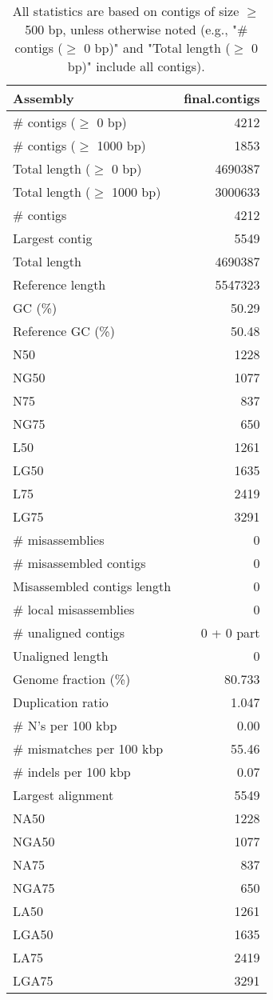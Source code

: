 \documentclass[12pt,a4paper]{article}
\begin{document}
\begin{table}[ht]
\begin{center}
\caption{All statistics are based on contigs of size $\geq$ 500 bp, unless otherwise noted (e.g., "\# contigs ($\geq$ 0 bp)" and "Total length ($\geq$ 0 bp)" include all contigs).}
\begin{tabular}{|l*{1}{|r}|}
\hline
Assembly & final.contigs \\ \hline
\# contigs ($\geq$ 0 bp) & 4212 \\ \hline
\# contigs ($\geq$ 1000 bp) & 1853 \\ \hline
Total length ($\geq$ 0 bp) & 4690387 \\ \hline
Total length ($\geq$ 1000 bp) & 3000633 \\ \hline
\# contigs & 4212 \\ \hline
Largest contig & 5549 \\ \hline
Total length & 4690387 \\ \hline
Reference length & 5547323 \\ \hline
GC (\%) & 50.29 \\ \hline
Reference GC (\%) & 50.48 \\ \hline
N50 & 1228 \\ \hline
NG50 & 1077 \\ \hline
N75 & 837 \\ \hline
NG75 & 650 \\ \hline
L50 & 1261 \\ \hline
LG50 & 1635 \\ \hline
L75 & 2419 \\ \hline
LG75 & 3291 \\ \hline
\# misassemblies & 0 \\ \hline
\# misassembled contigs & 0 \\ \hline
Misassembled contigs length & 0 \\ \hline
\# local misassemblies & 0 \\ \hline
\# unaligned contigs & 0 + 0 part \\ \hline
Unaligned length & 0 \\ \hline
Genome fraction (\%) & 80.733 \\ \hline
Duplication ratio & 1.047 \\ \hline
\# N's per 100 kbp & 0.00 \\ \hline
\# mismatches per 100 kbp & 55.46 \\ \hline
\# indels per 100 kbp & 0.07 \\ \hline
Largest alignment & 5549 \\ \hline
NA50 & 1228 \\ \hline
NGA50 & 1077 \\ \hline
NA75 & 837 \\ \hline
NGA75 & 650 \\ \hline
LA50 & 1261 \\ \hline
LGA50 & 1635 \\ \hline
LA75 & 2419 \\ \hline
LGA75 & 3291 \\ \hline
\end{tabular}
\end{center}
\end{table}
\end{document}
